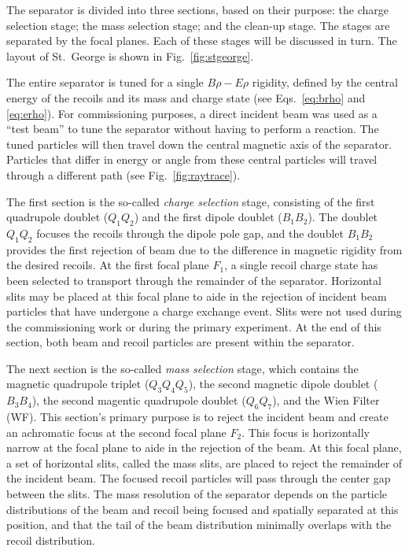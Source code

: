 The separator is divided into three sections, based on their purpose:
the charge selection stage; the mass selection stage; and the clean-up
stage. The stages are separated by the focal planes. Each of these
stages will be discussed in turn. The layout of St.\ George is shown in
Fig.~\ref{fig:stgeorge}.

The entire separator is tuned for a single $B\rho-E\rho$ rigidity,
defined by the central energy of the recoils and its mass and charge
state (see Eqs.~\ref{eq:brho} and \ref{eq:erho}). For commissioning
purposes, a direct incident beam was used as a ``test beam'' to tune the
separator without having to perform a reaction. The tuned particles will
then travel down the central magnetic axis of the separator. Particles
that differ in energy or angle from these central particles will travel
through a different path (see Fig.~\ref{fig:raytrace}).

The first section is the so-called \textit{charge selection} stage,
consisting of the first quadrupole doublet ($Q_1Q_2$) and the first
dipole doublet ($B_1B_2$). The doublet $Q_1Q_2$ focuses the recoils
through the dipole pole gap, and the doublet $B_1B_2$ provides the first
rejection of beam due to the difference in magnetic rigidity from the
desired recoils. At the first focal plane $F_1$, a single recoil charge
state has been selected to transport through the remainder of the
separator. Horizontal slits may be placed at this focal plane to aide in
the rejection of incident beam particles that have undergone a charge
exchange event. Slits were not used during the commissioning work or
during the primary experiment. At the end of this section, both beam and
recoil particles are present within the separator.

The next section is the so-called \textit{mass selection} stage, which
contains the magnetic quadrupole triplet ($Q_3Q_4Q_5$), the second
magnetic dipole doublet ($B_3B_4$), the second magentic quadrupole
doublet ($Q_6Q_7$), and the Wien Filter (WF). This section's primary
purpose is to reject the incident beam and create an achromatic focus at
the second focal plane $F_2$. This focus is horizontally narrow at the
focal plane to aide in the rejection of the beam. At this focal plane, a
set of horizontal slits, called the mass slits, are placed to reject the
remainder of the incident beam. The focused recoil particles will pass
through the center gap between the slits. The mass resolution of the
separator depends on the particle distributions of the beam and recoil
being focused and spatially separated at this position, and that the
tail of the beam distribution minimally overlaps with the recoil
distribution.


